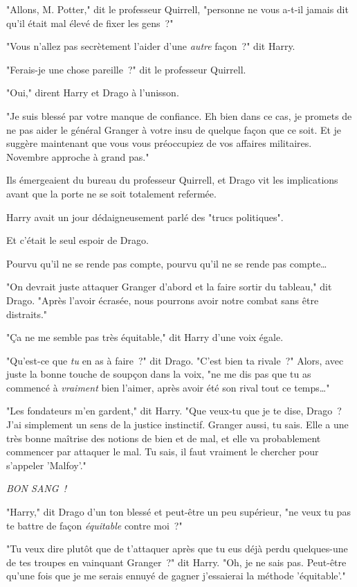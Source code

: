 "Allons, M. Potter," dit le professeur Quirrell, "personne ne vous a-t-il jamais dit qu'il était mal élevé de fixer les gens~?"

"Vous n'allez pas secrètement l'aider d'une \emph{autre} façon~?" dit Harry.

"Ferais-je une chose pareille~?" dit le professeur Quirrell.

"Oui," dirent Harry et Drago à l'unisson.

"Je suis blessé par votre manque de confiance. Eh bien dans ce cas, je promets de ne pas aider le général Granger à votre insu de quelque façon que ce soit. Et je suggère maintenant que vous vous préoccupiez de vos affaires militaires. Novembre approche à grand pas."

\later

Ils émergeaient du bureau du professeur Quirrell, et Drago vit les implications avant que la porte ne se soit totalement refermée.

Harry avait un jour dédaigneusement parlé des "trucs politiques".

Et c'était le seul espoir de Drago.

Pourvu qu'il ne se rende pas compte, pourvu qu'il ne se rende pas compte…

"On devrait juste attaquer Granger d'abord et la faire sortir du tableau," dit Drago. "Après l'avoir écrasée, nous pourrons avoir notre combat sans être distraits."

"Ça ne me semble pas très équitable," dit Harry d'une voix égale.

"Qu'est-ce que \emph{tu} en as à faire~?" dit Drago. "C'est bien ta rivale~?" Alors, avec juste la bonne touche de soupçon dans la voix, "ne me dis pas que tu as commencé à \emph{vraiment} bien l'aimer, après avoir été son rival tout ce temps…"

"Les fondateurs m'en gardent," dit Harry. "Que veux-tu que je te dise, Drago~? J'ai simplement un sens de la justice instinctif. Granger aussi, tu sais. Elle a une très bonne maîtrise des notions de bien et de mal, et elle va probablement commencer par attaquer le mal. Tu sais, il faut vraiment le chercher pour s'appeler 'Malfoy'."

\emph{BON SANG~!}

"Harry," dit Drago d'un ton blessé et peut-être un peu supérieur, "ne veux tu pas te battre de façon \emph{équitable} contre moi~?"

"Tu veux dire plutôt que de t'attaquer après que tu eus déjà perdu quelques-une de tes troupes en vainquant Granger~?" dit Harry. "Oh, je ne sais pas. Peut-être qu'une fois que je me serais ennuyé de gagner j'essaierai la méthode 'équitable'."

